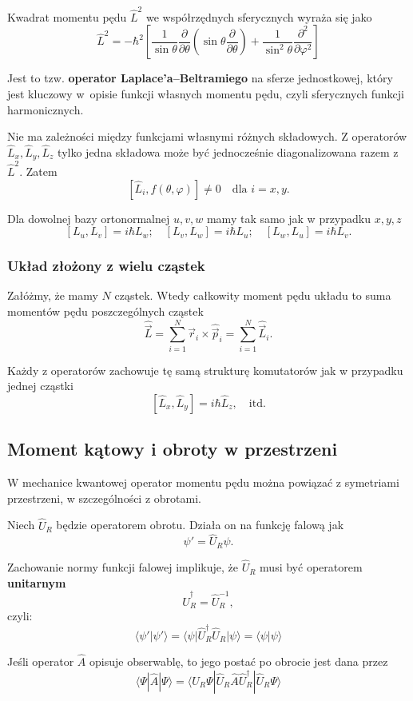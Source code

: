 Kwadrat momentu pędu $\hat{L}^2$ we współrzędnych sferycznych wyraża się jako
$$
\hat{L}^2 = -\hbar^2 \left[ \frac{1}{\sin\theta} \frac{\partial}{\partial\theta} \left( \sin\theta \frac{\partial}{\partial\theta} \right) + \frac{1}{\sin^2\theta} \frac{\partial^2}{\partial\varphi^2} \right]
$$

Jest to tzw. \textbf{operator Laplace'a--Beltramiego} na sferze jednostkowej,
który jest kluczowy w~opisie funkcji własnych momentu pędu, czyli sferycznych
funkcji harmonicznych.

Nie ma zależności między funkcjami własnymi różnych składowych.
Z operatorów $\hat{L}_x, \hat{L}_y, \hat{L}_z$ tylko jedna składowa może być
jednocześnie diagonalizowana razem z $\hat{L}^2$. Zatem
$$
[\hat{L}_i, f(\theta, \varphi)] \ne 0 \quad \text{dla } i = x, y.
$$

Dla dowolnej bazy ortonormalnej $u, v, w$ mamy tak samo
jak w przypadku $x, y, z$
$$
[L_u, L_v] = i\hbar L_w ; \quad [L_v, L_w] = i\hbar L_u ; \quad [L_w, L_u] = i\hbar L_v.
$$

\subsubsection*{Układ złożony z wielu cząstek}
Załóżmy, że mamy $N$ cząstek. Wtedy całkowity moment pędu układu to suma momentów pędu poszczególnych cząstek
$$
\hat{\vec{L}} = \sum_{i=1}^N \vec{r}_i \times \hat{\vec{p}}_i = \sum_{i=1}^N \hat{\vec{L}}_i.
$$

Każdy z operatorów zachowuje tę samą strukturę komutatorów jak w przypadku jednej cząstki
$$
[\hat{L}_x, \hat{L}_y] = i\hbar \hat{L}_z, \quad \text{itd.}
$$

\subsection{Moment kątowy i obroty w przestrzeni}
W mechanice kwantowej operator momentu pędu można powiązać z symetriami przestrzeni, w szczególności z obrotami.

Niech $\hat{U}_R$ będzie operatorem obrotu. Działa on na funkcję falową jak
$$
\psi' = \hat{U}_R \psi.
$$

Zachowanie normy funkcji falowej implikuje, że $\hat{U}_R$ musi być operatorem \textbf{unitarnym}
$$
\hat{U}_R^\dagger = \hat{U}_R^{-1},
$$
czyli:
$$
\langle \psi' | \psi' \rangle = \langle \psi | \hat{U}_R^\dagger \hat{U}_R | \psi \rangle = \langle \psi | \psi \rangle
$$

Jeśli operator $\hat{A}$ opisuje obserwablę, to jego postać po obrocie jest dana przez
$$
\langle \Psi | \hat{A} | \Psi \rangle = \langle \hat{U}_R \Psi | \hat{U}_R \hat{A} \hat{U}_R^\dagger | \hat{U}_R \Psi \rangle
$$

